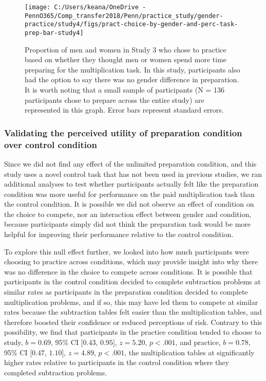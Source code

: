 \documentclass[letterpaper, nobind]{templates/ociamthesis}
\begin{document}
\begin{figure}

{\centering \texttt{[image: C:/Users/keana/OneDrive - PennO365/Comp\_transfer2018/Penn/practice\_study/gender-practice/study4/figs/pract-choice-by-gender-and-perc-task-prep-bar-study4]} 

}

\caption{Proportion of men and women in Study 3 who chose to practice based on whether they thought men or women spend more time preparing for the multiplication task. In this study, participants also had the option to say there was no gender difference in preparation. It is worth noting that a small sample of participants (N = 136 participants chose to prepare across the entire study) are represented in this graph. Error bars represent standard errors.}\label{fig:pract-choice-by-gender-and-perc-task-prep-bar-study4}
\end{figure}

\hypertarget{validating-the-perceived-utility-of-preparation-condition-over-control-condition}{%
\subsubsection{Validating the perceived utility of preparation condition over control condition}\label{validating-the-perceived-utility-of-preparation-condition-over-control-condition}}

Since we did not find any effect of the unlimited preparation condition, and this study uses a novel control task that has not been used in previous studies, we ran additional analyses to test whether participants actually felt like the preparation condition was more useful for performance on the paid multiplication task than the control condition. It is possible we did not observe an effect of condition on the choice to compete, nor an interaction effect between gender and condition, because participants simply did not think the preparation task would be more helpful for improving their performance relative to the control condition.

To explore this null effect further, we looked into how much participants were choosing to practice across conditions, which may provide insight into why there was no difference in the choice to compete across conditions. It is possible that participants in the control condition decided to complete subtraction problems at similar rates as participants in the preparation condition decided to complete multiplication problems, and if so, this may have led them to compete at similar rates because the subtraction tables felt easier than the multiplication tables, and therefore boosted their confidence or reduced perceptions of risk. Contrary to this possibility, we find that participants in the practice condition tended to choose to study, \(b = 0.69\), 95\% CI \([0.43\), \(0.95]\), \(z = 5.20\), \(p < .001\), and practice, \(b = 0.78\), 95\% CI \([0.47\), \(1.10]\), \(z = 4.89\), \(p < .001\), the multiplication tables at significantly higher rates relative to participants in the control condition where they completed subtraction problems.
\end{document}
